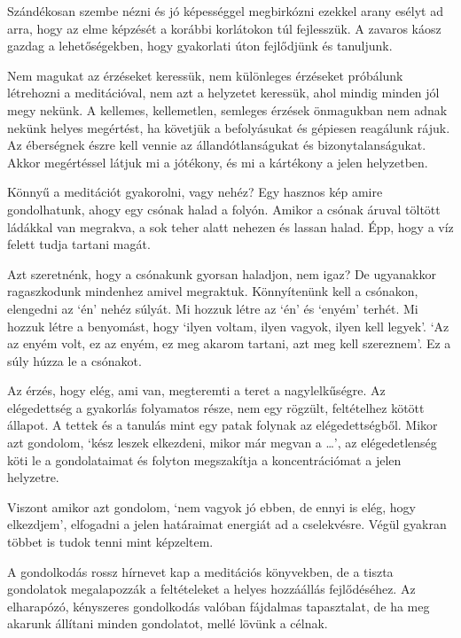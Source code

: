 Szándékosan szembe nézni és jó képességgel megbirkózni ezekkel arany
esélyt ad arra, hogy az elme képzését a korábbi korlátokon túl
fejlesszük. A zavaros káosz gazdag a lehetőségekben, hogy gyakorlati
úton fejlődjünk és tanuljunk.

Nem magukat az érzéseket keressük, nem különleges érzéseket próbálunk
létrehozni a meditációval, nem azt a helyzetet keressük, ahol mindig
minden jól megy nekünk. A kellemes, kellemetlen, semleges érzések
önmagukban nem adnak nekünk helyes megértést, ha követjük a befolyásukat
és gépiesen reagálunk rájuk. Az éberségnek észre kell vennie az
állandótlanságukat és bizonytalanságukat. Akkor megértéssel látjuk mi a
jótékony, és mi a kártékony a jelen helyzetben.


Könnyű a meditációt gyakorolni, vagy nehéz? Egy hasznos kép amire
gondolhatunk, ahogy egy csónak halad a folyón. Amikor a csónak áruval
töltött ládákkal van megrakva, a sok teher alatt nehezen és lassan
halad. Épp, hogy a víz felett tudja tartani magát.

Azt szeretnénk, hogy a csónakunk gyorsan haladjon, nem igaz? De
ugyanakkor ragaszkodunk mindenhez amivel megraktuk. Könnyítenünk kell a
csónakon, elengedni az `én' nehéz súlyát. Mi hozzuk létre az `én' és
`enyém' terhét. Mi hozzuk létre a benyomást, hogy `ilyen voltam, ilyen
vagyok, ilyen kell legyek'. `Az az enyém volt, ez az enyém, ez meg
akarom tartani, azt meg kell szereznem'. Ez a súly húzza le a csónakot.

Az érzés, hogy elég, ami van, megteremti a teret a nagylelkűségre. Az
elégedettség a gyakorlás folyamatos része, nem egy rögzült, feltételhez
kötött állapot. A tettek és a tanulás mint egy patak folynak az
elégedettségből. Mikor azt gondolom, `kész leszek elkezdeni, mikor már
megvan a \ldots{}', az elégedetlenség köti le a gondolataimat és folyton
megszakítja a koncentrációmat a jelen helyzetre.


Viszont amikor azt gondolom, `nem vagyok jó ebben, de ennyi is elég,
hogy elkezdjem', elfogadni a jelen határaimat energiát ad a cselekvésre.
Végül gyakran többet is tudok tenni mint képzeltem.

A gondolkodás rossz hírnevet kap a meditációs könyvekben, de a tiszta
gondolatok megalapozzák a feltételeket a helyes hozzáállás fejlődéséhez.
Az elharapózó, kényszeres gondolkodás valóban fájdalmas tapasztalat, de
ha meg akarunk állítani minden gondolatot, mellé lövünk a célnak.

